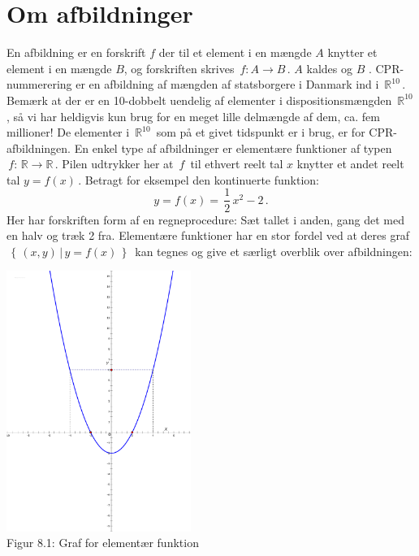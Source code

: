 \section{Om afbildninger}
En afbildning er en forskrift $f$ der til et element i en mængde $A$ knytter et element i en mængde $B$, og forskriften skrives $\,f:A\rightarrow B\,$. $A$ kaldes  og $B$ .\bs
CPR-nummerering er en afbildning af mængden af statsborgere i Danmark ind i $\,\mathbb R^{10}\,$. Bemærk at der er en 10-dobbelt uendelig af elementer i dispositionsmængden $\,\mathbb R^{10}\,$, så vi har  heldigvis kun brug for en meget lille delmængde af dem, ca. fem millioner! De elementer i $\,\mathbb R^{10}\,$ som på et givet tidspunkt er i brug, er  for CPR-afbildningen.\bs   
En enkel type af afbildninger er elementære funktioner af typen $\,f:\,\mathbb R \rightarrow \mathbb R\,.$ Pilen udtrykker her at $\,f\,$ til ethvert reelt tal $x$ knytter et andet reelt tal $y=f(x)\,$. Betragt for eksempel den kontinuerte funktion:
\begin{equation}\label{funktion}
y=f(x)=\,\frac 12\,x^2-2\,.
\end{equation}
Her har forskriften form af en regneprocedure: Sæt tallet i anden, gang det med en halv og træk 2 fra. Elementære funktioner har en stor fordel ved at deres graf $\,\left\{\,(x,y)\,|\,y=f(x)\,\right\}\,$ kan tegnes og give et særligt overblik over afbildningen:
\begin{center}
		\includegraphics[trim=5.5cm 8.5cm 3cm
 9.5cm,width=0.45\textwidth,clip]{graf.pdf}
  \\Figur 8.1: Graf for elementær funktion%
\end{center}

